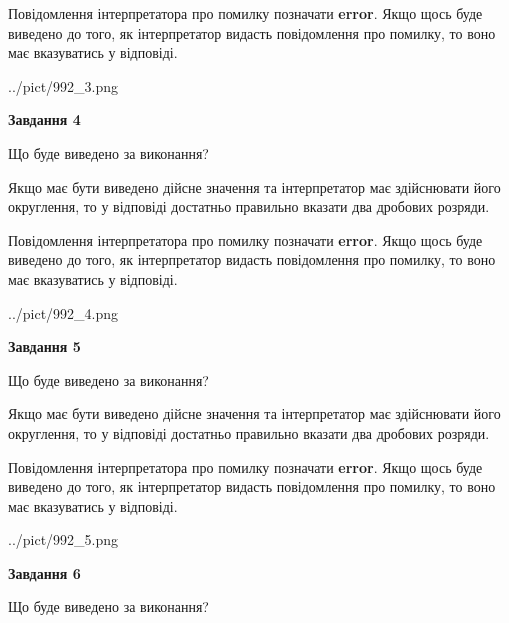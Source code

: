 \documentclass[12pt, ukrainian]{article}
\begin{document}
{\begin {Large}
Повідомлення інтерпретатора про помилку позначати \textbf{error}.
Якщо щось буде виведено до того, як інтерпретатор видасть повідомлення про помилку, 
то воно має вказуватись у відповіді. \par

\begin{center}
	{../pict/992_3.png}
\end{center}
\newpage

{\begin {center}\textbf{Завдання 4}\end {center}}\par
Що буде виведено за виконання? \par

Якщо має бути виведено дійсне значення та інтерпретатор має здійснювати його округлення, 
то у відповіді достатньо правильно вказати два дробових розряди.

Повідомлення інтерпретатора про помилку позначати \textbf{error}.
Якщо щось буде виведено до того, як інтерпретатор видасть повідомлення про помилку, 
то воно має вказуватись у відповіді. \par

\begin{center}
	{../pict/992_4.png}
\end{center}
\newpage

{\begin {center}\textbf{Завдання 5}\end {center}}\par
Що буде виведено за виконання? \par

Якщо має бути виведено дійсне значення та інтерпретатор має здійснювати його округлення, 
то у відповіді достатньо правильно вказати два дробових розряди.

Повідомлення інтерпретатора про помилку позначати \textbf{error}.
Якщо щось буде виведено до того, як інтерпретатор видасть повідомлення про помилку, 
то воно має вказуватись у відповіді. \par

\begin{center}
	{../pict/992_5.png}
\end{center}
\newpage

{\begin {center}\textbf{Завдання 6}\end {center}}\par
Що буде виведено за виконання? \par


\end{Large}}
\end{document}
